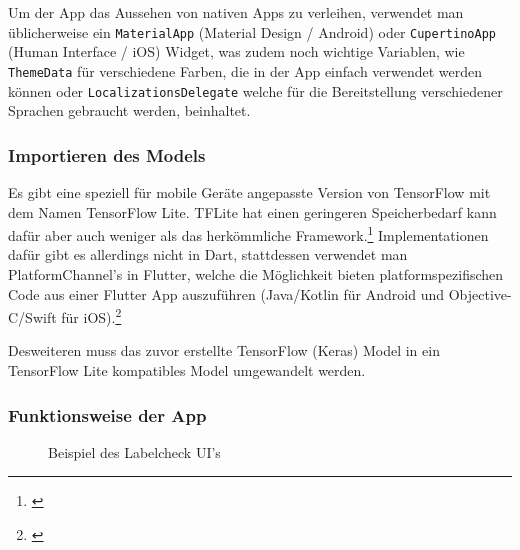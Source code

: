 Um der App das Aussehen von nativen Apps zu verleihen, verwendet man üblicherweise ein \texttt{MaterialApp} (Material Design / Android) oder \texttt{CupertinoApp} (Human Interface / iOS) Widget, was zudem noch wichtige Variablen, wie \texttt{ThemeData} für verschiedene Farben, die in der App einfach verwendet werden können oder \texttt{LocalizationsDelegate} welche für die Bereitstellung verschiedener Sprachen gebraucht werden, beinhaltet.

\subsubsection{Importieren des Models}

Es gibt eine speziell für mobile Geräte angepasste Version von TensorFlow mit dem Namen TensorFlow Lite. TFLite hat einen geringeren Speicherbedarf kann dafür aber auch weniger als das herkömmliche Framework.\footnote{\cite{tflite}} Implementationen dafür gibt es allerdings nicht in Dart, stattdessen verwendet man PlatformChannel's in Flutter, welche die Möglichkeit bieten platformspezifischen Code aus einer Flutter App auszuführen (Java/Kotlin für Android und Objective-C/Swift für iOS).\footnote{\cite{flutterplatformcode}}

Desweiteren muss das zuvor erstellte TensorFlow (Keras) Model in ein TensorFlow Lite kompatibles Model umgewandelt werden.

\subsubsection{Funktionsweise der App}

\setlength{\belowcaptionskip}{-10pt}
\begin{wrapfigure}{r}{55mm}
  \caption[]{Beispiel des Labelcheck UI's}
  \label{screenshot}
\end{wrapfigure}
\setlength{\belowcaptionskip}{0pt}

